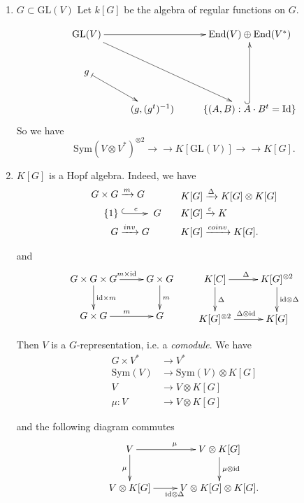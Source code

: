 \begin{enumerate}
\item $G\subset \text{GL}(V)$
Let $k[G]$ be the algebra of regular
functions on  $G$.

$$
\xymatrix{
\text{GL}(V)\ar[rr]\ar[ddrr]&&\text{End}(V)
\oplus  \text{End}(V^* )\\
g \ar@{|->}[rd]\\
&(g,(g^t)^{-1})&
\{(A,B) : A \cdot
B^t=\text{Id}\}\ar@{^{(}->}[uu].
}
$$
So we have
$$
\text{Sym}(V \otimes V^* )^{\otimes 2}
\to\!\!\!\!\!\to K[\text{GL}(V)]
\to\!\!\!\!\!\to K[G].
$$

\item $K[G]$ is a Hopf algebra. Indeed, we
have
\begin{align*}
\begin{aligned}
G\times G &  \xrightarrow{m}G\\
\{1\}&\xymatrix{\ar@{^{(}->}[r]^e&} G\\
G &  \xrightarrow{inv}G
\end{aligned}\qquad
\begin{aligned}
K[G] &\xrightarrow{\Delta}K[G]\otimes K[G]\\
K[G]&  \xrightarrow{\varepsilon}K\\
K[G]&\xrightarrow{coinv}K[G].
\end{aligned}
\end{align*}

\noindent
and
$$
\xymatrix{
G \times G \times G\ar[r]^{m \times
\text{id}}\ar[d]^{\text{id} \times m}
&G \times G\ar[d]^{m}\\
G \times G\ar[r]^{m}
&G
}
\qquad
\xymatrix{
K[C]\ar[r]^{\Delta}\ar[d]^{\Delta}
&K[G]^{\otimes 2}\ar[d]^{\text{id} \otimes
\Delta}\\
K[G]^{\otimes 2}\ar[r]^{\Delta \otimes
\text{id}}
&K[G]
}
$$

Then $V$ is a $G$-representation, i.e. a {\it
comodule}.
We have
$$
\begin{aligned}
G \times V^*&\to V^*\\
\text{Sym}(V) & \to \text{Sym}(V) \otimes
K[G]\\
V & \to V \otimes K[G]\\
\mu:V & \to V \otimes K[G]
\end{aligned}
$$

and the following diagram commutes
\begin{equation}
\label{equation-diagram}
\xymatrix{
V\ar[r]^{\mu}\ar[d]_{\mu}
&V \otimes K[G]\ar[d]^{\mu \otimes
\text{id}}\\
V \otimes K[G]\ar[r]_{\text{id} \otimes
\Delta}
&V \otimes K[G] \otimes K[G].
}
\end{equation}


\end{enumerate}
